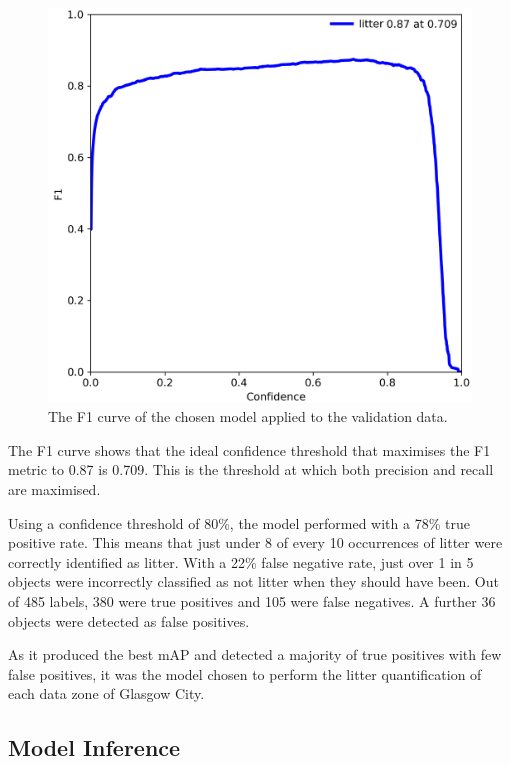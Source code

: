 \documentclass{thesis}
\begin{document}
\begin{figure}[h!]
    \centering
    \includegraphics[scale=0.5]{images/f1-curve.png}
    \caption{The F1 curve of the chosen model applied to the validation data.}
    \label{fig:f1-curve}
\end{figure}

The F1 curve shows that the ideal confidence threshold that maximises the F1 metric to 0.87 is 0.709. This is the threshold at which both precision and recall are maximised.

Using a confidence threshold of 80\%, the model performed with a 78\% true positive rate. This means that just under 8 of every 10 occurrences of litter were correctly identified as litter. With a 22\% false negative rate, just over 1 in 5 objects were incorrectly classified as not litter when they should have been. Out of 485 labels, 380 were true positives and 105 were false negatives. A further 36 objects were detected as false positives.

As it produced the best mAP and detected a majority of true positives with few false positives, it was the model chosen to perform the litter quantification of each data zone of Glasgow City.

\subsection{Model Inference}
\end{document}
